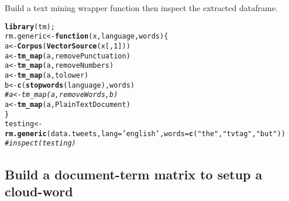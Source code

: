 \documentclass[9pt,english]{extarticle}\usepackage[]{graphicx}\usepackage[]{color}
\makeatletter
\newcommand{\hlnum}[1]{\textcolor[rgb]{0.686,0.059,0.569}{#1}}%
\newcommand{\hlstr}[1]{\textcolor[rgb]{0.192,0.494,0.8}{#1}}%
\newcommand{\hlcom}[1]{\textcolor[rgb]{0.678,0.584,0.686}{\textit{#1}}}%
\newcommand{\hlstd}[1]{\textcolor[rgb]{0.345,0.345,0.345}{#1}}%
\newcommand{\hlkwa}[1]{\textcolor[rgb]{0.161,0.373,0.58}{\textbf{#1}}}%
\newcommand{\hlkwb}[1]{\textcolor[rgb]{0.69,0.353,0.396}{#1}}%
\newcommand{\hlkwc}[1]{\textcolor[rgb]{0.333,0.667,0.333}{#1}}%
\newcommand{\hlkwd}[1]{\textcolor[rgb]{0.737,0.353,0.396}{\textbf{#1}}}%
\newenvironment{kframe}{%
 \def\at@end@of@kframe{}%
 \ifinner\ifhmode%
  \def\at@end@of@kframe{\end{minipage}}%
  \begin{minipage}{\columnwidth}%
 \fi\fi%
 \def\FrameCommand##1{\hskip\@totalleftmargin \hskip-\fboxsep
 \colorbox{shadecolor}{##1}\hskip-\fboxsep
     \hskip-\linewidth \hskip-\@totalleftmargin \hskip\columnwidth}%
 \MakeFramed {\advance\hsize-\width
   \@totalleftmargin\z@ \linewidth\hsize
   \@setminipage}}%
 {\par\unskip\endMakeFramed%
 \at@end@of@kframe}
\newenvironment{knitrout}{}{} %
\makeatother
\begin{document}
\begin{linenumbers}
Build a text mining wrapper function then inspect the extracted dataframe.
\begin{knitrout}
\color{fgcolor}\begin{kframe}
\begin{alltt}
\hlkwd{library}\hlstd{(tm);}
\hlstd{rm.generic} \hlkwb{<-} \hlkwa{function}\hlstd{(}\hlkwc{x}\hlstd{,}\hlkwc{language}\hlstd{,}\hlkwc{words}\hlstd{)\{}
    \hlstd{a} \hlkwb{<-} \hlkwd{Corpus}\hlstd{(}\hlkwd{VectorSource}\hlstd{(x[,}\hlnum{1}\hlstd{]))}
    \hlstd{a} \hlkwb{<-} \hlkwd{tm_map}\hlstd{(a, removePunctuation)}
    \hlstd{a} \hlkwb{<-} \hlkwd{tm_map}\hlstd{(a, removeNumbers)}
    \hlstd{a} \hlkwb{<-} \hlkwd{tm_map}\hlstd{(a, tolower)}
    \hlstd{b} \hlkwb{<-} \hlkwd{c}\hlstd{(}\hlkwd{stopwords}\hlstd{(language),words)}
\hlcom{#    a <- tm_map(a, removeWords, b)}
    \hlstd{a} \hlkwb{<-} \hlkwd{tm_map}\hlstd{(a,PlainTextDocument)}
\hlstd{\}}
\hlstd{testing} \hlkwb{<-} \hlkwd{rm.generic}\hlstd{(data.tweets,} \hlkwc{lang}\hlstd{=}\hlstr{'english'}\hlstd{,} \hlkwc{words}\hlstd{=}\hlkwd{c}\hlstd{(}\hlstr{"the"}\hlstd{,}\hlstr{"tvtag"}\hlstd{,}\hlstr{"but"}\hlstd{))}
\hlcom{#inspect(testing)}
\end{alltt}
\end{kframe}
\end{knitrout}


\subsection{Build a document-term matrix to setup a cloud-word}

\label{subsec:label}
\label{subsec:wordcloud}


\end{linenumbers}
\end{document}
